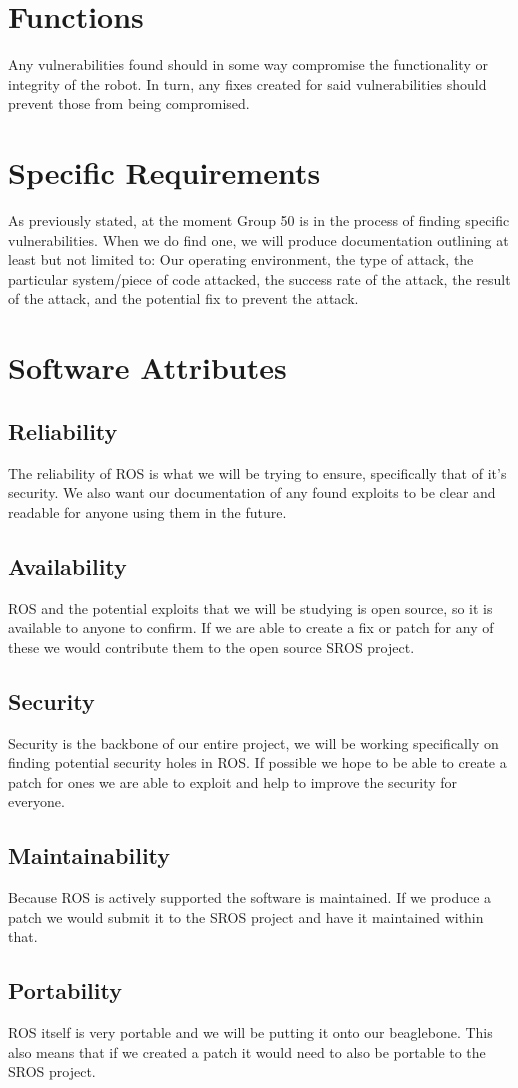 \documentclass{scrreprt}
\begin{document}
\section{Functions}
Any vulnerabilities found should in some way compromise the functionality or integrity of the robot. In turn, any fixes created for said vulnerabilities should prevent those from being compromised.

\section{Specific Requirements}
As previously stated, at the moment Group 50 is in the process of finding specific vulnerabilities. When we do find one, we will produce documentation outlining at least but not limited to:
Our operating environment, the type of attack, the particular system/piece of code attacked, the success rate of the attack, the result of the attack, and the potential fix to prevent the attack.

\section{Software Attributes}
  \subsection{Reliability}
  The reliability of ROS is what we will be trying to ensure, specifically that of it's security.
  We also want our documentation of any found exploits to be clear and readable for anyone using them in the future.

  \subsection{Availability}
  ROS and the potential exploits that we will be studying is open source, so it is available to anyone to confirm.
  If we are able to create a fix or patch for any of these we would contribute them to the open source SROS project.

  \subsection{Security}
  Security is the backbone of our entire project, we will be working specifically on finding potential security holes in ROS.
  If possible we hope to be able to create a patch for ones we are able to exploit and help to improve the security for everyone.

  \subsection{Maintainability}
  Because ROS is actively supported the software is maintained.
  If we produce a patch we would submit it to the SROS project and have it maintained within that.

  \subsection{Portability}
  ROS itself is very portable and we will be putting it onto our beaglebone.
  This also means that if we created a patch it would need to also be portable to the SROS project.
\end{document}
